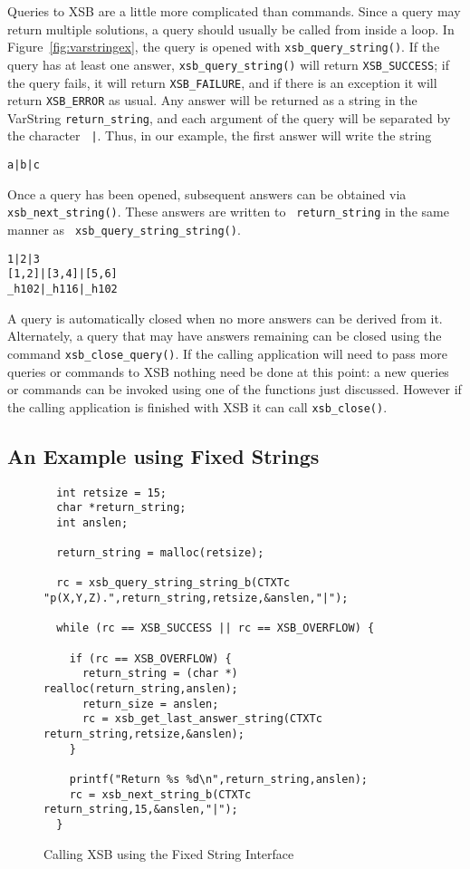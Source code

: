 Queries to XSB are a little more complicated than commands.  Since a
query may return multiple solutions, a query should usually be called
from inside a loop.  In Figure~\ref{fig:varstringex}, the query is
opened with {\tt xsb\_query\_string()}.  If the query has at least one
answer, {\tt xsb\_query\_string()} will return {\tt XSB\_SUCCESS}; if
the query fails, it will return {\tt XSB\_FAILURE}, and if there is an
exception it will return {\tt XSB\_ERROR} as usual.   Any answer will
be returned as a string in the VarString {\tt return\_string}, and
each argument of the query will be separated by the character {\tt
  |}.  Thus, in our example, the first answer will write the string
%
\begin{small}
\begin{verbatim}
a|b|c
\end{verbatim}
\end{small}
% 
Once a query has been opened, subsequent answers can be obtained via
{\tt xsb\_next\_string()}.  These answers are written to {\tt
  return\_string} in the same manner as {\tt
  xsb\_query\_string\_string()}.
%
\begin{small}
\begin{verbatim}
1|2|3
[1,2]|[3,4]|[5,6]
_h102|_h116|_h102
\end{verbatim}
\end{small}
%
A query is automatically closed when no more answers can be derived
from it.  Alternately, a query that may have answers remaining can be
closed using the command {\tt xsb\_close\_query()}.  If the calling
application will need to pass more queries or commands to XSB nothing
need be done at this point: a new queries or commands can be invoked
using one of the functions just discussed.  However if the calling
application is finished with XSB it can call {\tt xsb\_close()}.

\subsection{An Example using Fixed Strings}

\begin{figure}[hbtp]
\begin{small}
\begin{verbatim}
  int retsize = 15;
  char *return_string;
  int anslen;

  return_string = malloc(retsize);

  rc = xsb_query_string_string_b(CTXTc "p(X,Y,Z).",return_string,retsize,&anslen,"|");

  while (rc == XSB_SUCCESS || rc == XSB_OVERFLOW) {
  
    if (rc == XSB_OVERFLOW) {
      return_string = (char *) realloc(return_string,anslen);
      return_size = anslen;
      rc = xsb_get_last_answer_string(CTXTc return_string,retsize,&anslen);
    }    

    printf("Return %s %d\n",return_string,anslen);
    rc = xsb_next_string_b(CTXTc return_string,15,&anslen,"|");
  }
\end{verbatim}
\end{small}
\caption{Calling XSB using the Fixed String Interface} \label{fig:fixedstringex}
\end{figure}

